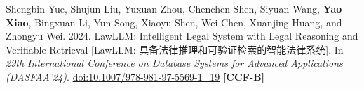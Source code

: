 Shengbin Yue, Shujun Liu, Yuxuan Zhou, Chenchen Shen, Siyuan Wang, \textbf{Yao Xiao}, Bingxuan Li, Yun Song, Xiaoyu Shen, Wei Chen, Xuanjing Huang, and Zhongyu Wei. 2024. LawLLM: Intelligent Legal System with Legal Reasoning and Verifiable Retrieval [LawLLM: 具备法律推理和可验证检索的智能法律系统]. In \textit{29th International Conference on Database Systems for Advanced Applications (DASFAA'24)}. \href{https://doi.org/10.1007/978-981-97-5569-1_19}{doi:10.1007/978-981-97-5569-1\_19} \textbf{[CCF-B]}
